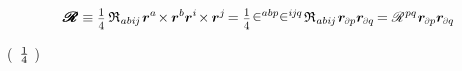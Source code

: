 \begin{otherlanguage}{russian}
{\begin{equation*}
\hspace{.1ex}\pmb{\scalebox{1.2}[1]{$\mathscr{R}$}} \equiv
\smalldisplaystyleonefourth \hspace{.4ex} \mathfrak{R}_{\hspace{.1ex}abi\hspace{-0.1ex}j} \hspace{.2ex} \locationvector^a \hspace{-0.33ex} \times \hspace{-0.1ex} \locationvector^b \locationvector^i \hspace{-0.33ex} \times \hspace{-0.1ex} \locationvector^j \hspace{-0.25ex}
= \smalldisplaystyleonefourth \hspace{.15ex} \levicivita^{abp} \levicivita^{i\hspace{-0.1ex}j\hspace{-0.1ex}q} \hspace{.25ex} \mathfrak{R}_{\hspace{.1ex}abi\hspace{-0.1ex}j} \hspace{.2ex} \locationvector_\differentialindex{p} \locationvector_\differentialindex{q} \hspace{-0.2ex}
= \mathscr{R}^{\hspace{.1ex}pq} \hspace{.1ex} \locationvector_\differentialindex{p} \locationvector_\differentialindex{q}
\end{equation*}

\vspace{-0.2em} \noindent
(~$\onefourth$
)

}
\end{otherlanguage}
